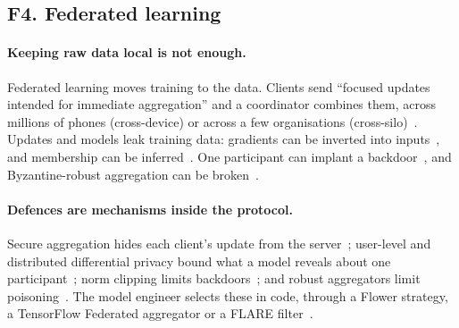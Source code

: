 \subsection{F4. Federated learning}
\label{sec:survey-fl}

\paragraph{Keeping raw data local is not enough.} Federated learning moves
training to the data. Clients send ``focused updates intended for immediate
aggregation'' and a coordinator combines them, across millions of phones
(cross-device) or across a few organisations
(cross-silo)~\citep{mcmahan2017communication,kairouz2021advances,li2020federated,huang2022crosssilo}.
Updates and models leak training data: gradients can be inverted into
inputs~\citep{zhu2019deep,geiping2020inverting}, and membership can be
inferred~\citep{shokri2017membership,nasr2019comprehensive}. One participant can
implant a backdoor~\citep{bagdasaryan2020backdoor}, and Byzantine-robust
aggregation can be broken~\citep{fang2020local}.

\paragraph{Defences are mechanisms inside the protocol.} Secure aggregation
hides each client's update from the server~\citep{bonawitz2017practical,bell2020secure};
user-level and distributed differential privacy bound what a model reveals about
one participant~\citep{mcmahan2018learning,kairouz2021distributed}; norm
clipping limits backdoors~\citep{sun2019really}; and robust aggregators limit
poisoning~\citep{blanchard2017machine,yin2018byzantine}. The model engineer
selects these in code, through a Flower strategy, a TensorFlow Federated
aggregator or a FLARE filter~\citep{beutel2020flower,google2026tff,roth2023nvidia}.

